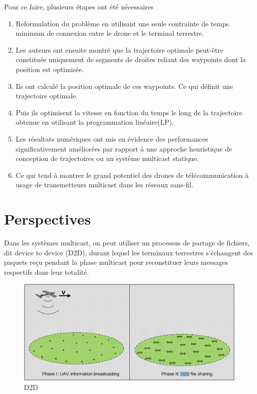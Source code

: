 \documentclass[utf8, a4paper]{beamer}
\begin{document}
\begin{frame} {}
 Pour ce faire, plusieurs étapes ont été nécessaires\pause

\begin{enumerate}
	\item Reformulation du problème en utilisant une seule contrainte
	de temps minimum de connexion entre le drone et le terminal terrestre.\pause
	
	\item Les auteurs ont ensuite montré que la trajectoire optimale
	peut-être constituée uniquement de segments de droites reliant des
	waypoints dont la position est optimisée.\pause
	\item Ils ont calculé la position optimale de ces waypoints.
	Ce qui définit une trajectoire optimale. \pause  
	\item Puis ils optimisent la vitesse en fonction du temps le long de la trajectoire obtenue
	en utilisant la programmation linéaire(LP).\pause
	\item Les résultats numériques ont mis en évidence des performances significativement améliorées
	 par rapport à une approche heuristique de conception de trajectoires ou un système multicast statique.\pause
	\item Ce qui tend à montrer le grand potentiel des drones de 
	télécommunication à usage de transmetteurs multicast dans les réseaux sans-fil.
	 
\end{enumerate}
\end{frame}


\section
{Perspectives}

\begin{frame} {}

Dans les systèmes multicast, on peut utiliser un processus de partage de fichiers,
dit device to device (D2D), durant lequel les terminaux terrestres
s'échangent des paquets reçu pendant la phase multicast pour reconstituer leurs messages
respectifs dans leur totalité. 

 \begin{figure}[t]
	\centering
	\includegraphics[height=\dimexpr11\textheight/16\relax]{d2d}
	\caption{D2D}
\end{figure}


\end{frame}
\end{document}
